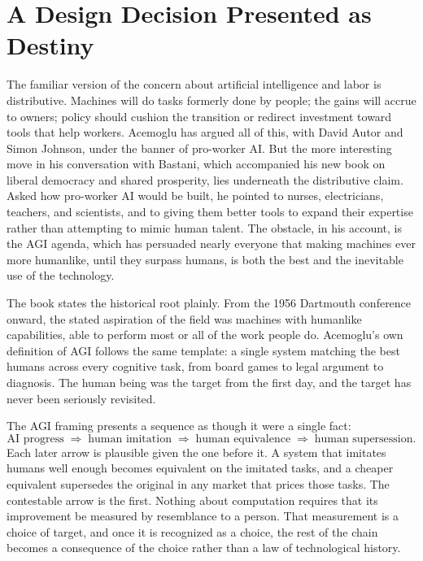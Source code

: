 \documentclass[11pt]{article}
\begin{document}
\section{A Design Decision Presented as Destiny}

The familiar version of the concern about artificial intelligence and labor is distributive. Machines will do tasks formerly done by people; the gains will accrue to owners; policy should cushion the transition or redirect investment toward tools that help workers. Acemoglu has argued all of this, with David Autor and Simon Johnson, under the banner of pro-worker AI. But the more interesting move in his conversation with Bastani, which accompanied his new book on liberal democracy and shared prosperity, lies underneath the distributive claim. Asked how pro-worker AI would be built, he pointed to nurses, electricians, teachers, and scientists, and to giving them better tools to expand their expertise rather than attempting to mimic human talent. The obstacle, in his account, is the AGI agenda, which has persuaded nearly everyone that making machines ever more humanlike, until they surpass humans, is both the best and the inevitable use of the technology.

The book states the historical root plainly. From the 1956 Dartmouth conference onward, the stated aspiration of the field was machines with humanlike capabilities, able to perform most or all of the work people do. Acemoglu's own definition of AGI follows the same template: a single system matching the best humans across every cognitive task, from board games to legal argument to diagnosis. The human being was the target from the first day, and the target has never been seriously revisited.

The AGI framing presents a sequence as though it were a single fact:
\[
\text{AI progress}
\;\Longrightarrow\;
\text{human imitation}
\;\Longrightarrow\;
\text{human equivalence}
\;\Longrightarrow\;
\text{human supersession}.
\]
Each later arrow is plausible given the one before it. A system that imitates humans well enough becomes equivalent on the imitated tasks, and a cheaper equivalent supersedes the original in any market that prices those tasks. The contestable arrow is the first. Nothing about computation requires that its improvement be measured by resemblance to a person. That measurement is a choice of target, and once it is recognized as a choice, the rest of the chain becomes a consequence of the choice rather than a law of technological history.
\end{document}
